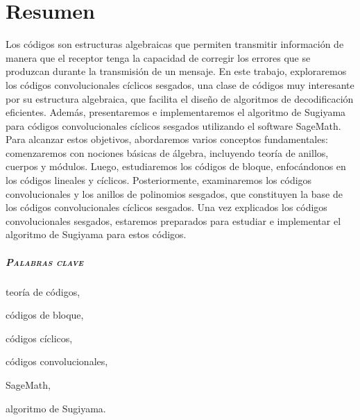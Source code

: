 %


\chapter*{Resumen}

Los códigos son estructuras algebraicas que permiten transmitir información de manera que el receptor tenga la capacidad de corregir los errores que se produzcan durante la transmisión de un mensaje. En este trabajo, exploraremos los códigos convolucionales cíclicos sesgados, una clase de códigos muy interesante por su estructura algebraica, que facilita el diseño de algoritmos de decodificación eficientes. Además, presentaremos e implementaremos  el algoritmo de Sugiyama para códigos convolucionales cíclicos sesgados utilizando el software SageMath. Para alcanzar estos objetivos, abordaremos varios conceptos fundamentales: comenzaremos con nociones básicas de álgebra, incluyendo teoría de anillos, cuerpos y módulos. Luego, estudiaremos los códigos de bloque, enfocándonos en los códigos lineales y cíclicos. Posteriormente, examinaremos los códigos convolucionales y los anillos de polinomios sesgados, que constituyen la base de los códigos convolucionales cíclicos sesgados. Una vez explicados los códigos convolucionales sesgados, estaremos preparados para estudiar e implementar el algoritmo de Sugiyama para estos códigos.


\paragraph{\textsc{Palabras clave}}
\begin{inparaitem}[\hspace{1em}]
  \item teoría de códigos,
  \item códigos de bloque,
  \item códigos cíclicos,
  \item códigos convolucionales,
  \item SageMath,
  \item algoritmo de Sugiyama.
\end{inparaitem}





\endinput
